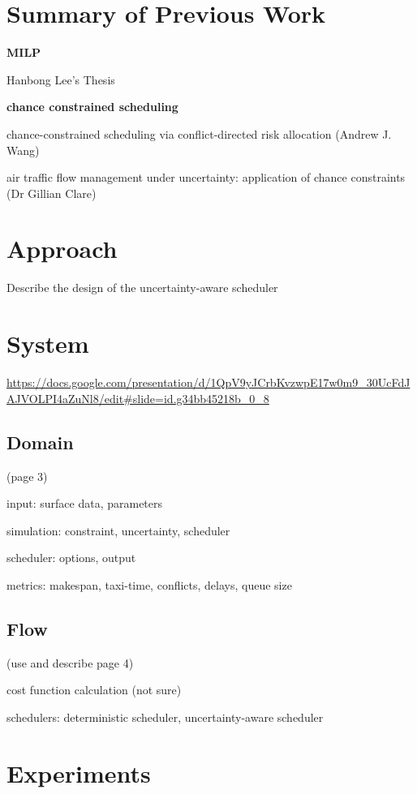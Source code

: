 \documentclass[letterpaper, 10 pt, conference]{ieeeconf}
\begin{document}
\section{Summary of Previous Work}

\textbf{MILP}

Hanbong Lee's Thesis

\textbf{chance constrained scheduling}

chance-constrained scheduling via conflict-directed risk allocation (Andrew J. Wang)

air traffic flow management under uncertainty: application of chance constraints (Dr Gillian Clare)

\section{Approach}

Describe the design of the uncertainty-aware scheduler

\section{System}

\url{https://docs.google.com/presentation/d/1QpV9yJCrbKvzwpE17w0m9_30UcFdJAJVOLPI4aZuNl8/edit#slide=id.g34bb45218b_0_8}

\subsection{Domain}

 (page 3)

input: surface data, parameters

simulation: constraint, uncertainty, scheduler

scheduler: options, output

metrics: makespan, taxi-time, conflicts, delays, queue size

\subsection{Flow}

(use and describe page 4)

cost function calculation (not sure)

schedulers: deterministic scheduler, uncertainty-aware scheduler

\section{Experiments}
\end{document}
